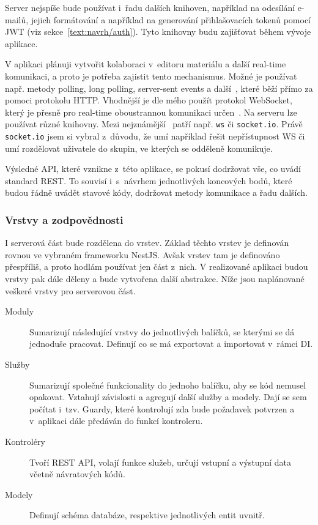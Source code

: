 Server nejspíše bude používat i~řadu dalších knihoven, například na odesílání e-mailů, jejich formátování a například na generování přihlašovacích tokenů pomocí JWT (viz sekce~\ref{text:navrh/auth}).
Tyto knihovny budu zajišťovat během vývoje aplikace.

V aplikaci plánuji vytvořit kolaboraci v~editoru materiálu a další real-time komunikaci, a proto je potřeba zajistit tento mechanismus.
Možné je používat např. metody polling, long polling, server-sent events a další~\cite{subramanian_2021}, které běží přímo za pomoci protokolu HTTP.
Vhodnější je dle mého použít protokol WebSocket, který je přesně pro real-time oboustrannou komunikaci určen~\cite{rfc6455}.
Na serveru lze používat různé knihovny.
Mezi nejznámější~\cite{uzayr2022frontend} patří např. \verb|ws| či \verb|socket.io|.
Právě \verb|socket.io| jsem si vybral z~důvodu, že umí například řešit nepřístupnost WS či umí rozdělovat uživatele do skupin, ve kterých se odděleně komunikuje.

Výsledné API, které vznikne z~této aplikace, se pokusí dodržovat vše, co uvádí standard REST.
To souvisí i~s~návrhem jednotlivých koncových bodů, které budou řádně uvádět stavové kódy, dodržovat metody komunikace a řadu dalších.

\subsubsection{Vrstvy a zodpovědnosti}

I serverová část bude rozdělena do vrstev. 
Základ těchto vrstev je definován rovnou ve vybraném frameworku NestJS.
Avšak vrstev tam je definováno přespříliš, a proto hodlám používat jen část z~nich.
V realizované aplikaci budou vrstvy pak dále děleny a bude vytvořena další abstrakce.
Níže jsou naplánované veškeré vrstvy pro serverovou část.

\begin{description}
    \item[Moduly] Sumarizují následující vrstvy do jednotlivých balíčků, se kterými se dá jednoduše pracovat. Definují co se má exportovat a importovat v~rámci DI.
    \item[Služby] Sumarizují společné funkcionality do jednoho balíčku, aby se kód nemusel opakovat. Vztahují závislosti a agregují další služby a modely. Dají se sem počítat i~tzv. Guardy, které kontrolují zda bude požadavek potvrzen a v~aplikaci dále předáván do funkcí kontroleru.
    \item[Kontroléry] Tvoří REST API, volají funkce služeb, určují vstupní a výstupní data včetně návratových kódů.
    \item[Modely] Definují schéma databáze, respektive jednotlivých entit uvnitř.
\end{description}


